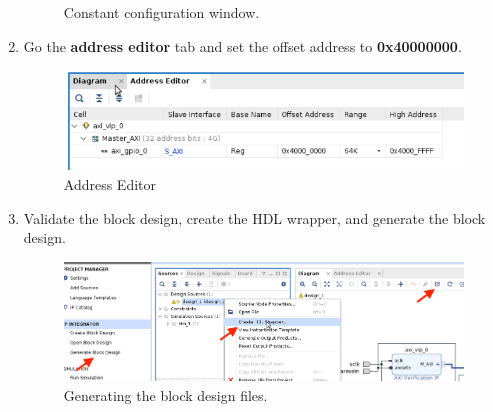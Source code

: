 \documentclass[12pt]{article}
\begin{document}
\begin{enumerate}
\begin{figure}[H]
		  \caption{Constant configuration window.}
		  \label{fig:axiconstantconfig}
		\end{figure}
	\item Go the \textbf{address editor} tab and set the offset address to \textbf{0x40000000}.
		\begin{figure}[H]
		  \centering
		  \includegraphics[scale=0.5]{addresseditor.png}
		  \caption{Address Editor}
		  \label{fig:addresseditor}
		\end{figure}
	\item Validate the block design, create the HDL wrapper, and generate the block design. 
		\begin{figure}[H]
		  \centering
		  \includegraphics[scale=0.4]{validatebd.png}
		  \caption{Generating the block design files.}
		  \label{fig:validatebd.png}
		\end{figure}
\end{enumerate}
\end{document}
